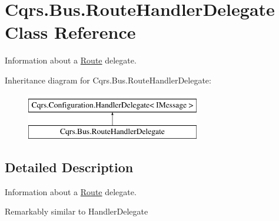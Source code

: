 \hypertarget{classCqrs_1_1Bus_1_1RouteHandlerDelegate}{}\section{Cqrs.\+Bus.\+Route\+Handler\+Delegate Class Reference}
\label{classCqrs_1_1Bus_1_1RouteHandlerDelegate}


Information about a \hyperlink{classCqrs_1_1Bus_1_1Route}{Route} delegate.  


Inheritance diagram for Cqrs.\+Bus.\+Route\+Handler\+Delegate\+:\begin{figure}[H]
\begin{center}
\leavevmode
\includegraphics[height=2.000000cm]{classCqrs_1_1Bus_1_1RouteHandlerDelegate}
\end{center}
\end{figure}


\subsection{Detailed Description}
Information about a \hyperlink{classCqrs_1_1Bus_1_1Route}{Route} delegate. 

Remarkably similar to Handler\+Delegate